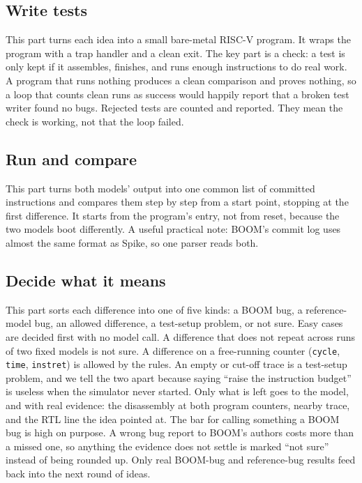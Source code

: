 \documentclass[conference]{IEEEtran}
\newcommand{\code}[1]{\texttt{\small #1}}
\begin{document}
\subsection{Write tests}
This part turns each idea into a small bare-metal RISC-V program. It wraps the
program with a trap handler and a clean exit. The key part is a check: a test is
only kept if it assembles, finishes, and runs enough instructions to do real
work. A program that runs nothing produces a clean comparison and proves
nothing, so a loop that counts clean runs as success would happily report that a
broken test writer found no bugs. Rejected tests are counted and reported. They
mean the check is working, not that the loop failed.

\subsection{Run and compare}
This part turns both models' output into one common list of committed
instructions and compares them step by step from a start point, stopping at the
first difference. It starts from the program's entry, not from reset, because
the two models boot differently. A useful practical note: BOOM's commit log uses
almost the same format as Spike, so one parser reads both.

\subsection{Decide what it means}
This part sorts each difference into one of five kinds: a BOOM bug, a
reference-model bug, an allowed difference, a test-setup problem, or not sure.
Easy cases are decided first with no model call. A difference that does not
repeat across runs of two fixed models is not sure. A difference on a
free-running counter (\code{cycle}, \code{time}, \code{instret}) is allowed by
the rules. An empty or cut-off trace is a test-setup problem, and we tell the
two apart because saying ``raise the instruction budget'' is useless when the
simulator never started. Only what is left goes to the model, and with real
evidence: the disassembly at both program counters, nearby trace, and the RTL
line the idea pointed at. The bar for calling something a BOOM bug is high on
purpose. A wrong bug report to BOOM's authors costs more than a missed one, so
anything the evidence does not settle is marked ``not sure'' instead of being
rounded up. Only real BOOM-bug and reference-bug results feed back into the next
round of ideas.
\end{document}
